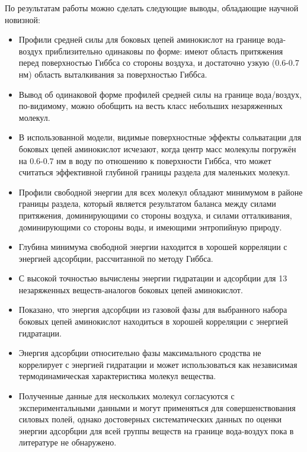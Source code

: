 По результатам работы можно сделать следующие выводы, обладающие научной новизной:
\begin{itemize}
\item Профили средней силы для боковых цепей аминокислот на границе вода-воздух приблизительно одинаковы по форме: имеют область притяжения перед поверхностью Гиббса со стороны воздуха, и достаточно узкую (0.6-0.7 нм) область выталкивания за поверхностью Гиббса.
\item Вывод об одинаковой форме профилей средней силы на границе вода/воздух, по-видимому, можно обобщить на весть класс небольших незаряженных молекул.
\item В использованной модели, видимые поверхностные эффекты сольватации для боковых цепей аминокислот исчезают, когда центр масс молекулы погружён на 0.6-0.7 нм в воду по отношению к поверхности Гиббса, что может считаться эффективной глубиной границы раздела для маленьких молекул.
\item Профили свободной энергии для всех молекул обладают минимумом в районе границы раздела, который является результатом баланса между силами притяжения, доминирующими со стороны воздуха, и силами отталкивания, доминирующими со стороны воды, и имеющими энтропийную природу.
\item Глубина минимума свободной энергии находится в хорошей корреляции с энергией адсорбции, рассчитанной по методу Гиббса.
\item С высокой точностью вычислены энергии гидратации и адсорбции для 13 незаряженных веществ-аналогов боковых цепей аминокислот.
\item Показано, что энергия адсорбции из газовой фазы для выбранного набора боковых цепей аминокислот находиться в хорошей корреляции с энергией гидратации.
\item Энергия адсорбции относительно фазы максимального сродства не коррелирует с энергией гидратации и может использоваться как независимая термодинамическая характеристика молекул вещества.
\item Полученные данные для нескольких молекул согласуются с экспериментальными данными и могут применяться для совершенствования силовых полей, однако достоверных систематических данных по оценки энергии адсорбции для всей группы веществ на границе вода-воздух пока в литературе не обнаружено.
\end{itemize}


